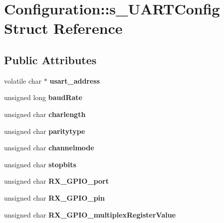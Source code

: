 \section{Configuration\+:\+:s\+\_\+\+U\+A\+R\+T\+Config Struct Reference}
\label{struct_configuration_1_1s___u_a_r_t_config}
\subsection*{Public Attributes}
\begin{DoxyCompactItemize}
\item 
volatile char $\ast$ {\bfseries usart\+\_\+address}\label{struct_configuration_1_1s___u_a_r_t_config_a7fadceefe1f7b47284a097cae3b6e479}

\item 
unsigned long {\bfseries baud\+Rate}\label{struct_configuration_1_1s___u_a_r_t_config_a721590e0c1c451c053fd8c7681e60763}

\item 
unsigned char {\bfseries charlength}\label{struct_configuration_1_1s___u_a_r_t_config_a074c7fe50e3f764d77a926af9c8beb66}

\item 
unsigned char {\bfseries paritytype}\label{struct_configuration_1_1s___u_a_r_t_config_afe94f688e5244eedf6b9f16e17980adc}

\item 
unsigned char {\bfseries channelmode}\label{struct_configuration_1_1s___u_a_r_t_config_a661bc1de2450f1d17c7ba563c00efcba}

\item 
unsigned char {\bfseries stopbits}\label{struct_configuration_1_1s___u_a_r_t_config_a734a1ebe5845db5ff7f23912f52ccffe}

\item 
unsigned char {\bfseries R\+X\+\_\+\+G\+P\+I\+O\+\_\+port}\label{struct_configuration_1_1s___u_a_r_t_config_a365303e7b78775eef78e155b03acfaa4}

\item 
unsigned char {\bfseries R\+X\+\_\+\+G\+P\+I\+O\+\_\+pin}\label{struct_configuration_1_1s___u_a_r_t_config_a485812d92664b61cc708c7fbeafe2114}

\item 
unsigned char {\bfseries R\+X\+\_\+\+G\+P\+I\+O\+\_\+multiplex\+Register\+Value}\label{struct_configuration_1_1s___u_a_r_t_config_a17f8e63b9fc146541d92414c635ede11}


\end{DoxyCompactItemize}
